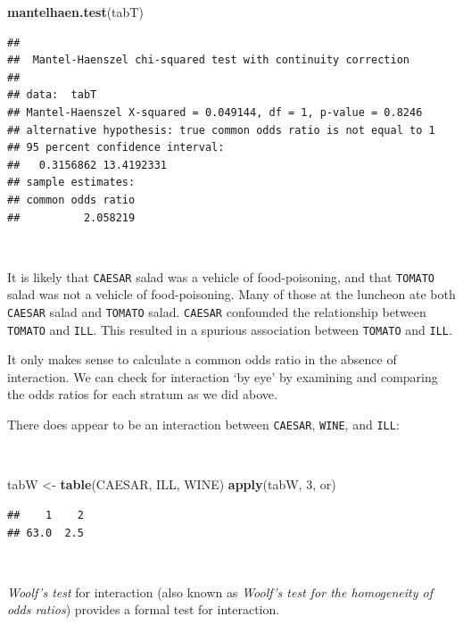 \documentclass[12pt,a4paper]{book}
\newenvironment{Shaded}{\begin{snugshade}}{\end{snugshade}}
\newcommand{\DecValTok}[1]{\textcolor[rgb]{0.00,0.00,0.81}{#1}}
\newcommand{\KeywordTok}[1]{\textcolor[rgb]{0.13,0.29,0.53}{\textbf{#1}}}
\newcommand{\NormalTok}[1]{#1}
\newcommand{\StringTok}[1]{\textcolor[rgb]{0.31,0.60,0.02}{#1}}
\theoremstyle{definition}
\theoremstyle{definition}
\theoremstyle{definition}
\theoremstyle{remark}
\begin{document}
\begin{Shaded}
\begin{Highlighting}[]
\KeywordTok{mantelhaen.test}\NormalTok{(tabT)}
\end{Highlighting}
\end{Shaded}

\begin{verbatim}
## 
##  Mantel-Haenszel chi-squared test with continuity correction
## 
## data:  tabT
## Mantel-Haenszel X-squared = 0.049144, df = 1, p-value = 0.8246
## alternative hypothesis: true common odds ratio is not equal to 1
## 95 percent confidence interval:
##   0.3156862 13.4192331
## sample estimates:
## common odds ratio 
##          2.058219
\end{verbatim}

~

It is likely that \texttt{CAESAR} salad was a vehicle of food-poisoning,
and that \texttt{TOMATO} salad was not a vehicle of food-poisoning. Many
of those at the luncheon ate both \texttt{CAESAR} salad and
\texttt{TOMATO} salad. \texttt{CAESAR} confounded the relationship
between \texttt{TOMATO} and \texttt{ILL}. This resulted in a spurious
association between \texttt{TOMATO} and \texttt{ILL}.

It only makes sense to calculate a common odds ratio in the absence of
interaction. We can check for interaction `by eye' by examining and
comparing the odds ratios for each stratum as we did above.

\newpage

There does appear to be an interaction between \texttt{CAESAR},
\texttt{WINE}, and \texttt{ILL}:

~

\begin{Shaded}
\begin{Highlighting}[]
\NormalTok{tabW <-}\StringTok{ }\KeywordTok{table}\NormalTok{(CAESAR, ILL, WINE)}
\KeywordTok{apply}\NormalTok{(tabW, }\DecValTok{3}\NormalTok{, or)}
\end{Highlighting}
\end{Shaded}

\begin{verbatim}
##    1    2 
## 63.0  2.5
\end{verbatim}

~

\emph{Woolf's test} for interaction (also known as \emph{Woolf's test
for the homogeneity of odds ratios}) provides a formal test for
interaction.
\end{document}
